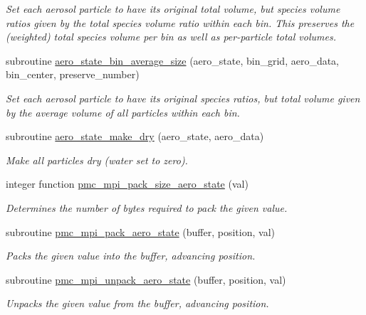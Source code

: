 \begin{DoxyCompactItemize}
\begin{DoxyCompactList}\small\item\em Set each aerosol particle to have its original total volume, but species volume ratios given by the total species volume ratio within each bin. This preserves the (weighted) total species volume per bin as well as per-\/particle total volumes. \end{DoxyCompactList}\item 
subroutine \mbox{\hyperlink{namespacepmc__aero__state_a3a54c3ceabc9c8f2bb878555a6b4c98a}{aero\+\_\+state\+\_\+bin\+\_\+average\+\_\+size}} (aero\+\_\+state, bin\+\_\+grid, aero\+\_\+data, bin\+\_\+center, preserve\+\_\+number)
\begin{DoxyCompactList}\small\item\em Set each aerosol particle to have its original species ratios, but total volume given by the average volume of all particles within each bin. \end{DoxyCompactList}\item 
subroutine \mbox{\hyperlink{namespacepmc__aero__state_a7e64dc08790a4600076982a43fe76221}{aero\+\_\+state\+\_\+make\+\_\+dry}} (aero\+\_\+state, aero\+\_\+data)
\begin{DoxyCompactList}\small\item\em Make all particles dry (water set to zero). \end{DoxyCompactList}\item 
integer function \mbox{\hyperlink{namespacepmc__aero__state_a9f65a578f1f08ed22c56a96686743cfd}{pmc\+\_\+mpi\+\_\+pack\+\_\+size\+\_\+aero\+\_\+state}} (val)
\begin{DoxyCompactList}\small\item\em Determines the number of bytes required to pack the given value. \end{DoxyCompactList}\item 
subroutine \mbox{\hyperlink{namespacepmc__aero__state_a4123bbc6bc887c5d4b7a6feae25be534}{pmc\+\_\+mpi\+\_\+pack\+\_\+aero\+\_\+state}} (buffer, position, val)
\begin{DoxyCompactList}\small\item\em Packs the given value into the buffer, advancing position. \end{DoxyCompactList}\item 
subroutine \mbox{\hyperlink{namespacepmc__aero__state_a1fbfce661ac4cf88b383e88a44e0a9b6}{pmc\+\_\+mpi\+\_\+unpack\+\_\+aero\+\_\+state}} (buffer, position, val)
\begin{DoxyCompactList}\small\item\em Unpacks the given value from the buffer, advancing position. \end{DoxyCompactList}\item 

\end{DoxyCompactItemize}
